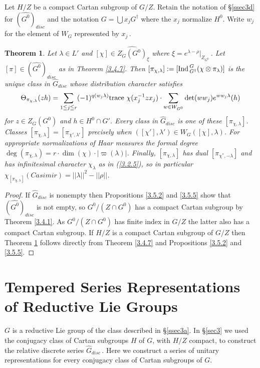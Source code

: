 \documentclass{conm-p-l}
\newtheorem{theorem}[equation]{Theorem}
\def\trace{{\rm trace\,\,}}
\def\Ind{{\rm Ind\,}}
\begin{document}
Let $H/Z$ be a compact Cartan subgroup of $G/Z$.  Retain the notation of
\S \ref{ssec3d} for $(\widehat{G^0})_{disc}$ and the notation 
$G = \bigcup x_jG^\dagger$ where the $x_j$ normalize $H^0$.  Write
$w_j$ for the element of $W_G$ represented by $x_j$\,.

\begin{theorem}\label{3.5.9}
Let $\lambda \in L'$ and $[\chi] \in \widehat{Z_G(G^0)}_\xi$ where
$\xi = e^{\lambda - \rho}|_{Z_{G^0}}$\,.  Let $[\pi] \in (\widehat{G^0})_{disc}$
as in {\rm Theorem \ref{3.4.7}}.  Then 
$[\pi_{\chi,\lambda}]:= [\Ind_{G^\dagger}^G(\chi\otimes\pi_\lambda)]$ is the
unique class in $\widehat{G}_{disc}$ whose distribution character satisfies
\begin{equation}\label{3.5.10}
\Theta_{\pi_{\chi,\lambda}}(zh) = 
\sum_{1\leqq j\leqq r} (-1)^{q(w_j\lambda)}\trace \chi(x_j^{-1}zx_j) \cdot
\sum_{w \in W_{G^0}} \det(ww_j)e^{ww_j\lambda}(h)
\end{equation}
for $z \in Z_G(G^0)$ and $h \in H^0\cap G'$.  Every class in 
$\widehat{G}_{disc}$ is one of these $[\pi_{\chi,\lambda}]$.  Classes
$[\pi_{\chi,\lambda}] = [\pi_{\chi',\lambda'}]$ precisely when 
$([\chi'],\lambda') \in W_G([\chi],\lambda)$.  For appropriate normalizations
of Haar measures the formal degree 
$\deg(\pi_{\chi,\lambda}) = r\cdot\dim(\chi)\cdot |\varpi(\lambda)|$.
Finally, $[\pi_{\chi,\lambda}]$ has dual $[\pi_{\chi^*,-\lambda}]$ and has
infinitesimal character $\chi_\lambda$ as in {\rm (\ref{3.2.5})}, so in
particular $\chi_{[\pi_{\chi,\lambda}]}(Casimir) = ||\lambda||^2-||\rho||$.
\end{theorem}

\begin{proof} If $\widehat{G}_{disc}$ is nonempty then Propositions \ref{3.5.2}
and \ref{3.5.5} show that $(\widehat{G^0})_{disc}$ is not empty, so 
$G^0/(Z\cap G^0)$ has a compact Cartan subgroup by Theorem \ref{3.4.1}.  As
$G^0/(Z\cap G^0)$ has finite index in $G/Z$ the latter also has a compact 
Cartan subgroup.  If $H/Z$ is a compact Cartan subgroup of $G/Z$ then
Theorem \ref{3.5.9} follows directly from Theorem \ref{3.4.7} and
Propositions \ref{3.5.2} and \ref{3.5.5}.
\end{proof}

\section{Tempered Series Representations of Reductive Lie Groups}
\label{sec4}
\setcounter{equation}{0}
$G$ is a reductive Lie group of the class described in \S\ref{ssec3a}.
In \S\ref{sec3} we used the conjugacy class of Cartan subgroups $H$ of $G$,
with $H/Z$ compact, to construct the relative discrete series
$\widehat{G}_{disc}$\,.  Here we construct a series of unitary representations
for every conjugacy class of Cartan subgroups of $G$.
\end{document}
